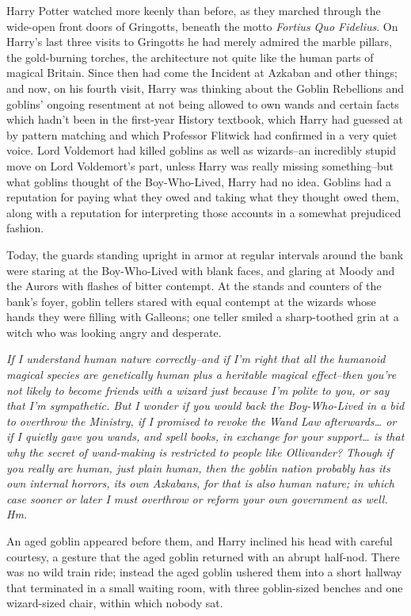 Harry Potter watched more keenly than before, as they marched through the wide-open front doors of Gringotts, beneath the motto \emph{Fortius Quo Fidelius}. On Harry's last three visits to Gringotts he had merely admired the marble pillars, the gold-burning torches, the architecture not quite like the human parts of magical Britain. Since then had come the Incident at Azkaban and other things; and now, on his fourth visit, Harry was thinking about the Goblin Rebellions and goblins' ongoing resentment at not being allowed to own wands and certain facts which hadn't been in the first-year History textbook, which Harry had guessed at by pattern matching and which Professor Flitwick had confirmed in a very quiet voice. Lord Voldemort had killed goblins as well as wizards\---an incredibly stupid move on Lord Voldemort's part, unless Harry was really missing something\---but what goblins thought of the Boy-Who-Lived, Harry had no idea. Goblins had a reputation for paying what they owed and taking what they thought owed them, along with a reputation for interpreting those accounts in a somewhat prejudiced fashion.

Today, the guards standing upright in armor at regular intervals around the bank were staring at the Boy-Who-Lived with blank faces, and glaring at Moody and the Aurors with flashes of bitter contempt. At the stands and counters of the bank's foyer, goblin tellers stared with equal contempt at the wizards whose hands they were filling with Galleons; one teller smiled a sharp-toothed grin at a witch who was looking angry and desperate.

\emph{If I understand human nature correctly\---and if I'm right that all the humanoid magical species are genetically human plus a heritable magical effect\---then you're not likely to become friends with a wizard just because I'm polite to you, or say that I'm sympathetic. But I wonder if you would back the Boy-Who-Lived in a bid to overthrow the Ministry, if I promised to revoke the Wand Law afterwards{\ldots} or if I quietly gave you wands, and spell books, in exchange for your support{\ldots} is that why the secret of wand-making is restricted to people like Ollivander? Though if you really are human, just plain human, then the goblin nation probably has its own internal horrors, its own Azkabans, for that is also human nature; in which case sooner or later I must overthrow or reform your own government as well. Hm.}

An aged goblin appeared before them, and Harry inclined his head with careful courtesy, a gesture that the aged goblin returned with an abrupt half-nod. There was no wild train ride; instead the aged goblin ushered them into a short hallway that terminated in a small waiting room, with three goblin-sized benches and one wizard-sized chair, within which nobody sat.

